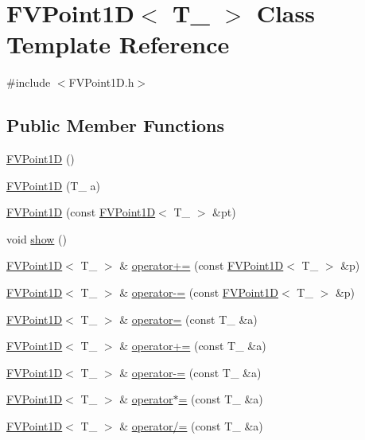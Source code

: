 \hypertarget{classFVPoint1D}{
\section{FVPoint1D$<$ T\_\- $>$ Class Template Reference}
\label{db/d45/classFVPoint1D}
}


{\ttfamily \#include $<$FVPoint1D.h$>$}

\subsection*{Public Member Functions}
\begin{DoxyCompactItemize}
\item 
\hyperlink{classFVPoint1D_a9d5054fe7e7e2832b27f356cfa5bacbd}{FVPoint1D} ()
\item 
\hyperlink{classFVPoint1D_af6d52af2749ac471acd7b77c12f84507}{FVPoint1D} (T\_\- a)
\item 
\hyperlink{classFVPoint1D_aa2edf97b1c190a03ae45406f1a519d60}{FVPoint1D} (const \hyperlink{classFVPoint1D}{FVPoint1D}$<$ T\_\- $>$ \&pt)
\item 
void \hyperlink{classFVPoint1D_a4b148f40a95444d5669406b918ad2f52}{show} ()
\item 
\hyperlink{classFVPoint1D}{FVPoint1D}$<$ T\_\- $>$ \& \hyperlink{classFVPoint1D_aeb0bb95463376c1bba717fb62ff46fe5}{operator+=} (const \hyperlink{classFVPoint1D}{FVPoint1D}$<$ T\_\- $>$ \&p)
\item 
\hyperlink{classFVPoint1D}{FVPoint1D}$<$ T\_\- $>$ \& \hyperlink{classFVPoint1D_a8fdd227910a3b785156de9164b0d286d}{operator-\/=} (const \hyperlink{classFVPoint1D}{FVPoint1D}$<$ T\_\- $>$ \&p)
\item 
\hyperlink{classFVPoint1D}{FVPoint1D}$<$ T\_\- $>$ \& \hyperlink{classFVPoint1D_a668ff64077a8e17f1b79648edb2ee7b8}{operator=} (const T\_\- \&a)
\item 
\hyperlink{classFVPoint1D}{FVPoint1D}$<$ T\_\- $>$ \& \hyperlink{classFVPoint1D_aac5ccabe1c1a79dc4ce1bef4c02fcf37}{operator+=} (const T\_\- \&a)
\item 
\hyperlink{classFVPoint1D}{FVPoint1D}$<$ T\_\- $>$ \& \hyperlink{classFVPoint1D_a181010296040d9211ec61275120e25cd}{operator-\/=} (const T\_\- \&a)
\item 
\hyperlink{classFVPoint1D}{FVPoint1D}$<$ T\_\- $>$ \& \hyperlink{classFVPoint1D_ae96120d39e8683891ffdf287d30e911b}{operator$\ast$=} (const T\_\- \&a)
\item 
\hyperlink{classFVPoint1D}{FVPoint1D}$<$ T\_\- $>$ \& \hyperlink{classFVPoint1D_af45b2089371f6be3278d15b1307d6e97}{operator/=} (const T\_\- \&a)
\end{DoxyCompactItemize}
